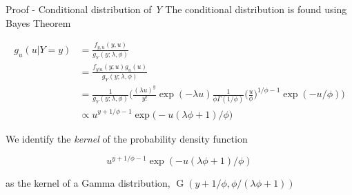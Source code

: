 \documentclass[aspectratio=169]{beamer}
\DeclareMathOperator{\G}{G}
\begin{document}
\begin{frame}{Proof - Conditional distribution of \emph{Y}}
\protect\hypertarget{proof---conditional-distribution-of-y}{}
The conditional distribution is found using Bayes Theorem

\begin{equation}
  \begin{aligned}
    g_{u}(u|Y=y)&=\frac{f_{y,u}(y,u)}{g_Y(y;\lambda, \phi)} \\
    &=\frac{f_{y|u}(y;u)g_{u}(u)}{g_{Y}(y;\lambda,\phi)} \\
    &=\frac{1}{g_{Y}(y;\lambda,\phi)}\bigg(\frac{(\lambda u)^y}{y!} \exp (-\lambda u) \frac{1}{\phi \Gamma(1/\phi)} \bigg(\frac{u}{\phi}\bigg)^{1/\phi-1} \exp (-u/\phi)\bigg) \\
    &\propto u^{y+1/\phi-1} \exp \big(- u(\lambda\phi+1)/\phi\big)
  \end{aligned}
\end{equation}

We identify the \emph{kernel} of the probability density function

\begin{equation}
  u^{y+1/\phi-1} \exp (- u(\lambda\phi+1)/\phi)
\end{equation}

as the kernel of a Gamma distribution,
\(\G(y+1/\phi,\phi/(\lambda\phi+1))\)
\end{frame}
\end{document}
